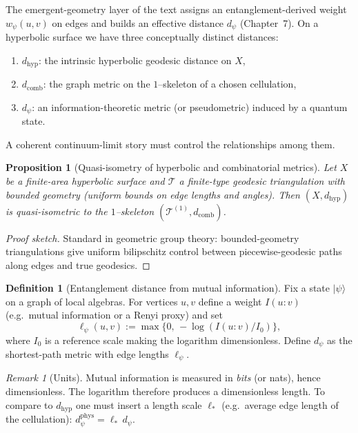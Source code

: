 \documentclass[11pt,oneside]{amsbook}
\numberwithin{equation}{section}
\theoremstyle{plain}
\newtheorem{proposition}[theorem]{Proposition}
\theoremstyle{definition}
\newtheorem{definition}[theorem]{Definition}
\theoremstyle{remark}
\newtheorem{remark}[theorem]{Remark}
\begin{document}
The emergent-geometry layer of the  text assigns an entanglement-derived weight $w_\psi(u,v)$ on edges and builds an effective distance $d_\psi$ (Chapter~7).
On a hyperbolic surface we have three conceptually distinct distances:

\begin{enumerate}
\item $d_{\mathrm{hyp}}$: the intrinsic hyperbolic geodesic distance on $X$,
\item $d_{\mathrm{comb}}$: the graph metric on the $1$--skeleton of a chosen cellulation,
\item $d_\psi$: an information-theoretic metric (or pseudometric) induced by a quantum state.
\end{enumerate}

A coherent continuum-limit story must control the relationships among them.

\begin{proposition}[Quasi-isometry of hyperbolic and combinatorial metrics]
\label{prop:quasi_isometry}
Let $X$ be a finite-area hyperbolic surface and $\mathcal{T}$ a finite-type geodesic triangulation with bounded geometry (uniform bounds on edge lengths and angles).
Then $(X,d_{\mathrm{hyp}})$ is quasi-isometric to the $1$--skeleton $(\mathcal{T}^{(1)},d_{\mathrm{comb}})$.
\end{proposition}

\begin{proof}[Proof sketch]
Standard in geometric group theory: bounded-geometry triangulations give uniform bilipschitz control between piecewise-geodesic paths along edges and true geodesics.
\end{proof}

\begin{definition}[Entanglement distance from mutual information]
Fix a state $|\psi\rangle$ on a graph of local algebras.
For vertices $u,v$ define a weight $I(u\!:\!v)$ (e.g.\ mutual information or a Renyi proxy) and set
\[
\ell_\psi(u,v):=\max\{0,\,-\log(I(u\!:\!v)/I_0)\},
\]
where $I_0$ is a reference scale making the logarithm dimensionless.
Define $d_\psi$ as the shortest-path metric with edge lengths $\ell_\psi$.
\end{definition}

\begin{remark}[Units]
Mutual information is measured in \emph{bits} (or nats), hence dimensionless.
The logarithm therefore produces a dimensionless length.
To compare to $d_{\mathrm{hyp}}$ one must insert a length scale $\ell_*$ (e.g.\ average edge length of the cellulation): $d^{\mathrm{phys}}_\psi=\ell_*\, d_\psi$.
\end{remark}
\end{document}
